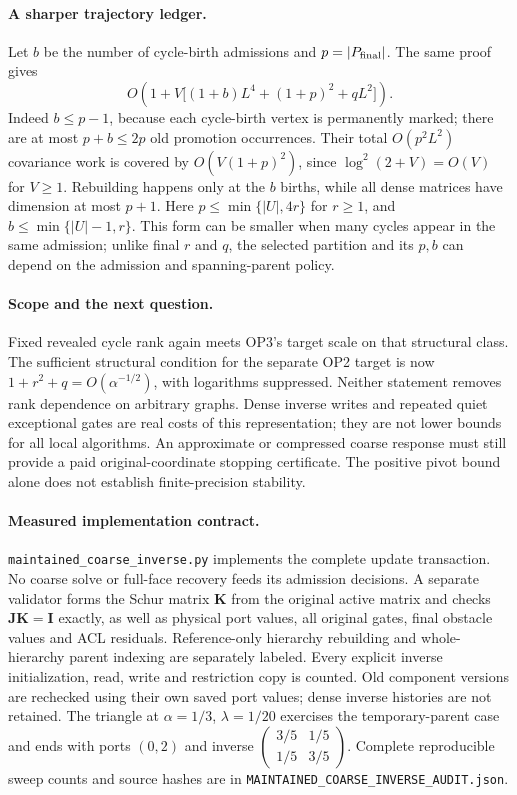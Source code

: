 \paragraph{A sharper trajectory ledger.}
Let $b$ be the number of cycle-birth admissions and $p=|P_{\rm final}|$.
The same proof gives
\[
 O\!\left(1+V\bigl[(1+b)L^4+(1+p)^2+qL^2\bigr]\right).
\]
Indeed $b\leq p-1$, because each cycle-birth vertex is permanently marked;
there are at most $p+b\leq2p$ old promotion occurrences. Their total
$O(p^2L^2)$ covariance work is covered by $O(V(1+p)^2)$, since
$\log^2(2+V)=O(V)$ for $V\geq1$. Rebuilding happens only at the $b$
births, while all dense matrices have dimension at most $p+1$.
Here $p\leq\min\{|U|,4r\}$ for $r\geq1$, and $b\leq\min\{|U|-1,r\}$.
This form can be smaller when many cycles appear in the same admission;
unlike final $r$ and $q$, the selected partition and its $p,b$ can depend
on the admission and spanning-parent policy.

\paragraph{Scope and the next question.}
Fixed revealed cycle rank again meets OP3's target scale on that structural
class. The sufficient structural condition for the separate OP2 target
is now $1+r^2+q=O(\alpha^{-1/2})$, with logarithms suppressed. Neither
statement removes rank dependence on arbitrary graphs. Dense inverse
writes and repeated quiet exceptional gates are real costs of this
representation; they are not lower bounds for all local algorithms.
An approximate or compressed coarse response must still provide a paid
original-coordinate stopping certificate. The positive pivot bound alone
does not establish finite-precision stability.

\paragraph{Measured implementation contract.}
\texttt{maintained\_coarse\_inverse.py} implements the complete update
transaction. No coarse solve or full-face recovery feeds its admission
decisions. A separate validator forms the Schur matrix $\boldsymbol K$
from the original active matrix and checks
$\boldsymbol J\boldsymbol K=\boldsymbol I$ exactly, as well as physical
port values, all original gates, final obstacle values and ACL residuals.
Reference-only hierarchy rebuilding and whole-hierarchy parent indexing
are separately labeled. Every explicit inverse initialization, read,
write and restriction copy is counted. Old component versions are
rechecked using their own saved port values; dense inverse histories are
not retained. The triangle at $\alpha=1/3$, $\lambda=1/20$ exercises
the temporary-parent case and ends with ports $(0,2)$ and inverse
$\left(\begin{smallmatrix}3/5&1/5\\1/5&3/5\end{smallmatrix}\right)$.
Complete reproducible sweep counts and source hashes are in
\texttt{MAINTAINED\_COARSE\_INVERSE\_AUDIT.json}.
